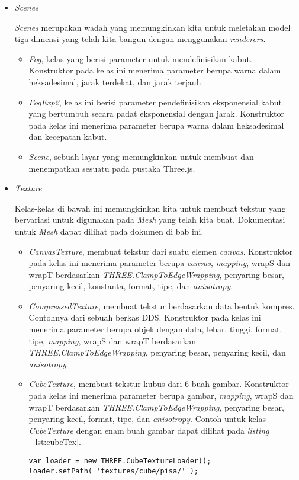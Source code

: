 \begin{itemize}
	\item \textit{Scenes}

	{\it Scenes} merupakan wadah yang memungkinkan kita untuk meletakan model tiga dimensi yang telah kita bangun dengan menggunakan {\it renderers}. 
	
	\begin{itemize}
		\item {\it Fog}, kelas yang berisi parameter untuk mendefinisikan kabut. Konstruktor pada kelas ini menerima parameter berupa warna dalam heksadesimal, jarak terdekat, dan jarak terjauh.
		\item {\it FogExp2}, kelas ini berisi parameter pendefinisikan eksponensial kabut yang bertumbuh secara padat eksponensial dengan jarak. Konstruktor pada kelas ini menerima parameter berupa warna dalam heksadesimal dan kecepatan kabut.
		\item {\it Scene}, sebuah layar yang memungkinkan untuk membuat dan menempatkan sesuatu pada pustaka Three.js. 
	\end{itemize}
	
	
	\item \textit{Texture}

	Kelas-kelas di bawah ini memungkinkan kita untuk membuat tekstur yang bervariasi untuk digunakan pada {\it Mesh} yang telah kita buat. Dokumentasi untuk {\it Mesh} dapat dilihat pada dokumen di bab ini.
	
	\begin{itemize}
	
		\item{\it CanvasTexture}, membuat tekstur dari suatu elemen {\it canvas}. Konstruktor pada kelas ini menerima parameter berupa {\it canvas}, {\it mapping}, wrapS dan wrapT berdasarkan {\it THREE.ClampToEdgeWrapping}, penyaring besar, penyaring kecil, konstanta, format, tipe, dan {\it anisotropy}.
		\item{\it CompressedTexture}, membuat tekstur berdasarkan data bentuk kompres. Contohnya dari sebuah berkas DDS. Konstruktor pada kelas ini menerima parameter berupa objek dengan data, lebar, tinggi, format, tipe, {\it mapping}, wrapS dan wrapT berdasarkan {\it THREE.ClampToEdgeWrapping}, penyaring besar, penyaring kecil, dan {\it anisotropy}.
		\item{\it CubeTexture}, membuat tekstur kubus dari 6 buah gambar. Konstruktor pada kelas ini menerima parameter berupa gambar, {\it mapping},  wrapS dan wrapT berdasarkan {\it THREE.ClampToEdgeWrapping}, penyaring besar, penyaring kecil, format, tipe, dan {\it anisotropy}. Contoh untuk kelas {\it CubeTexture} dengan enam buah gambar dapat dilihat pada {\it listing} ~\ref{lst:cubeTex}.
\begin{lstlisting}[caption={Contoh penggunaan kelas {\it CubeTexture}.}, label={lst:cubeTex},captionpos=b]
var loader = new THREE.CubeTextureLoader();
loader.setPath( 'textures/cube/pisa/' );


\end{lstlisting}
\end{itemize}
\end{itemize}
